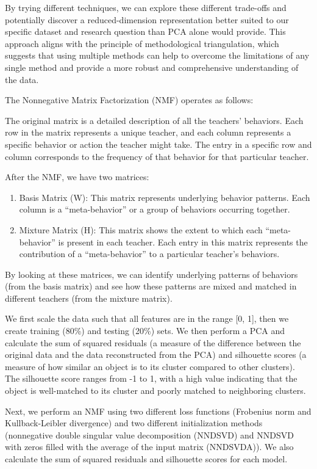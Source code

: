 \documentclass[
  number,
  preprint,
  3p,
  onecolumn]{elsarticle}
\providecommand{\tightlist}{%
  \setlength{\itemsep}{0pt}\setlength{\parskip}{0pt}}\usepackage{longtable,booktabs,array}
\begin{document}
By trying different techniques, we can explore these different
trade-offs and potentially discover a reduced-dimension representation
better suited to our specific dataset and research question than PCA
alone would provide. This approach aligns with the principle of
methodological triangulation, which suggests that using multiple methods
can help to overcome the limitations of any single method and provide a
more robust and comprehensive understanding of the data.

The Nonnegative Matrix Factorization (NMF) operates as follows:

The original matrix is a detailed description of all the teachers'
behaviors. Each row in the matrix represents a unique teacher, and each
column represents a specific behavior or action the teacher might take.
The entry in a specific row and column corresponds to the frequency of
that behavior for that particular teacher.

After the NMF, we have two matrices:

\begin{enumerate}
\def\labelenumi{\arabic{enumi}.}
\tightlist
\item
  Basis Matrix (W): This matrix represents underlying behavior patterns.
  Each column is a ``meta-behavior'' or a group of behaviors occurring
  together.
\item
  Mixture Matrix (H): This matrix shows the extent to which each
  ``meta-behavior'' is present in each teacher. Each entry in this
  matrix represents the contribution of a ``meta-behavior'' to a
  particular teacher's behaviors.
\end{enumerate}

By looking at these matrices, we can identify underlying patterns of
behaviors (from the basis matrix) and see how these patterns are mixed
and matched in different teachers (from the mixture matrix).

We first scale the data such that all features are in the range {[}0,
1{]}, then we create training (80\%) and testing (20\%) sets. We then
perform a PCA and calculate the sum of squared residuals (a measure of
the difference between the original data and the data reconstructed from
the PCA) and silhouette scores (a measure of how similar an object is to
its cluster compared to other clusters). The silhouette score ranges
from -1 to 1, with a high value indicating that the object is
well-matched to its cluster and poorly matched to neighboring clusters.

Next, we perform an NMF using two different loss functions (Frobenius
norm and Kullback-Leibler divergence) and two different initialization
methods (nonnegative double singular value decomposition (NNDSVD) and
NNDSVD with zeros filled with the average of the input matrix
(NNDSVDA)). We also calculate the sum of squared residuals and
silhouette scores for each model.
\end{document}
